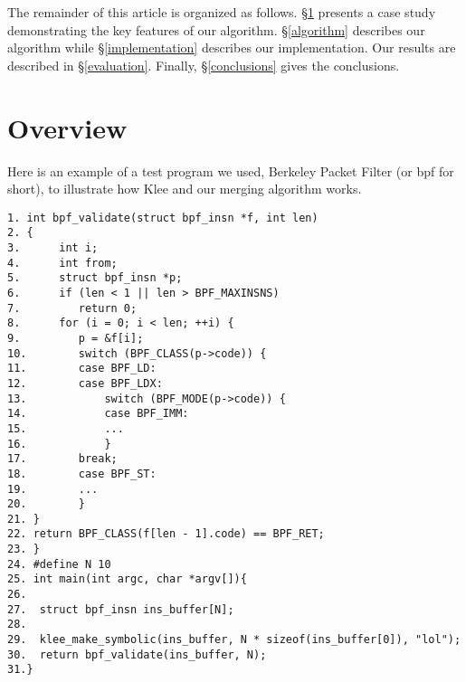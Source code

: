 \documentclass[12pt,a4paper]{article}
\begin{document}
The remainder of this article is organized as follows. \S\ref{overview} presents a case study demonstrating the key features of our algorithm. \S\ref{algorithm} describes our algorithm while \S\ref{implementation} describes our implementation. Our results are described in \S\ref{evaluation}. Finally, \S\ref{conclusions} gives the conclusions.

\section{Overview}\label{overview}
Here is an example of a test program we used, Berkeley Packet Filter (or bpf for short), to illustrate how Klee and our merging algorithm works.

\begin{verbatim}
1. int bpf_validate(struct bpf_insn *f, int len)
2. {
3.      int i;
4.      int from;
5.      struct bpf_insn *p;
6.      if (len < 1 || len > BPF_MAXINSNS)
7.         return 0;
8.      for (i = 0; i < len; ++i) {
9.         p = &f[i];
10.        switch (BPF_CLASS(p->code)) {
11.        case BPF_LD:
12.        case BPF_LDX:
13.            switch (BPF_MODE(p->code)) {
14.            case BPF_IMM:
15.            ...
16.            }
17.        break;
18.        case BPF_ST:
19.        ...
20.        }
21.	}
22.	return BPF_CLASS(f[len - 1].code) == BPF_RET;
23. }
24. #define N 10 
25. int main(int argc, char *argv[]){  
26.
27.  struct bpf_insn ins_buffer[N];
28.
29.  klee_make_symbolic(ins_buffer, N * sizeof(ins_buffer[0]), "lol");
30.  return bpf_validate(ins_buffer, N);
31.}
\end{verbatim}
\end{document}
